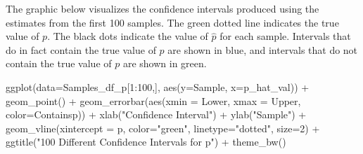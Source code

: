 \documentclass[
  letterpaper,
  DIV=11,
  numbers=noendperiod]{scrreprt}
\newenvironment{Shaded}{\begin{snugshade}}{\end{snugshade}}
\newcommand{\AttributeTok}[1]{\textcolor[rgb]{0.40,0.45,0.13}{#1}}
\newcommand{\DecValTok}[1]{\textcolor[rgb]{0.68,0.00,0.00}{#1}}
\newcommand{\FunctionTok}[1]{\textcolor[rgb]{0.28,0.35,0.67}{#1}}
\newcommand{\NormalTok}[1]{\textcolor[rgb]{0.00,0.23,0.31}{#1}}
\newcommand{\SpecialCharTok}[1]{\textcolor[rgb]{0.37,0.37,0.37}{#1}}
\newcommand{\StringTok}[1]{\textcolor[rgb]{0.13,0.47,0.30}{#1}}
\begin{document}
The graphic below visualizes the confidence intervals produced using the
estimates from the first 100 samples. The green dotted line indicates
the true value of \(p\). The black dots indicate the value of
\(\hat{p}\) for each sample. Intervals that do in fact contain the true
value of \(p\) are shown in blue, and intervals that do not contain the
true value of \(p\) are shown in green.

\begin{Shaded}
\begin{Highlighting}[]
\FunctionTok{ggplot}\NormalTok{(}\AttributeTok{data=}\NormalTok{Samples\_df\_p[}\DecValTok{1}\SpecialCharTok{:}\DecValTok{100}\NormalTok{,], }\FunctionTok{aes}\NormalTok{(}\AttributeTok{y=}\NormalTok{Sample, }\AttributeTok{x=}\NormalTok{p\_hat\_val)) }\SpecialCharTok{+}    
  \FunctionTok{geom\_point}\NormalTok{() }\SpecialCharTok{+}
  \FunctionTok{geom\_errorbar}\NormalTok{(}\FunctionTok{aes}\NormalTok{(}\AttributeTok{xmin =}\NormalTok{ Lower, }\AttributeTok{xmax =}\NormalTok{ Upper, }\AttributeTok{color=}\NormalTok{Containsp))  }\SpecialCharTok{+} 
  \FunctionTok{xlab}\NormalTok{(}\StringTok{"Confidence Interval"}\NormalTok{) }\SpecialCharTok{+} 
  \FunctionTok{ylab}\NormalTok{(}\StringTok{"Sample"}\NormalTok{) }\SpecialCharTok{+} 
  \FunctionTok{geom\_vline}\NormalTok{(}\AttributeTok{xintercept =}\NormalTok{ p, }\AttributeTok{color=}\StringTok{"green"}\NormalTok{, }\AttributeTok{linetype=}\StringTok{"dotted"}\NormalTok{, }\AttributeTok{size=}\DecValTok{2}\NormalTok{) }\SpecialCharTok{+} 
  \FunctionTok{ggtitle}\NormalTok{(}\StringTok{"100 Different Confidence Intervals for p"}\NormalTok{) }\SpecialCharTok{+} 
  \FunctionTok{theme\_bw}\NormalTok{() }
\end{Highlighting}
\end{Shaded}
\end{document}

